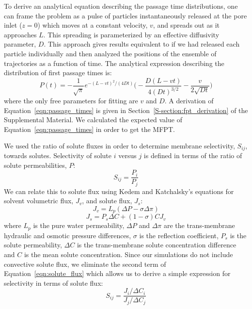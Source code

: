 \documentclass[aps,pre,preprint,groupedaddress,longbibliography]{revtex4-2}
\begin{document}
  To derive an analytical equation describing the passage time distributions, 
  one can frame the 
  problem as a pulse of particles instantaneously released at the pore inlet ($z=0$)
  which moves at a constant velocity, $v$, and spreads out as it approaches $L$. 
  This spreading is parameterized by an effective diffusivity parameter, $D$. This 
  approach gives results equivalent to if we had released each particle individually
  and then analyzed the positions of the ensemble of trajectories as 
  a function of time. The analytical expression describing the distribution of 
  first passage times is:~\cite{cussler_diffusion:_2009}
  \begin{equation}
  P(t) = -\frac{1}{\sqrt{\pi}}e^{-(L - vt)^2 / (4Dt)}\bigg(-\frac{D(L - vt)}{4(Dt)^{3/2}} - \frac{v}{2\sqrt{Dt}}\bigg)
  \label{eqn:passage_times}
  \end{equation} 
  where the only free parameters for fitting are $v$ and $D$. A derivation
  of Equation~\ref{eqn:passage_times} is given in Section~\ref{S-section:fpt_derivation}
  of the Supplemental Material. We calculated the expected value of 
  Equation~\ref{eqn:passage_times} in order to get the MFPT.

  We used the ratio of solute fluxes in order to determine membrane selectivity, $S_{ij}$,
  towards solutes. Selectivity of solute $i$ versus $j$ is defined in terms of the
  ratio of solute permeabilities, $P$:~\cite{guo_pervaporation_2004}
  \begin{equation}
  S_{ij} = \frac{P_i}{P_j}
  \end{equation}
  We can relate this to solute flux using Kedem and Katchalsky's equations for 
  solvent volumetric flux, $J_v$, and solute flux, $J_s$:~\cite{kedem_permeability_1963,al-zoubi_rejection_2007}
  \begin{equation}
  J_v = L_p(\Delta P - \sigma\Delta \pi)
  \end{equation} 
  \begin{equation}
  J_s = P_s \Delta C + (1 - \sigma)CJ_v
  \label{eqn:solute_flux}
  \end{equation}
  where $L_p$ is the pure water permeability, $\Delta P$ and $\Delta \pi$ are the 
  trans-membrane hydraulic and osmotic pressure differences, $\sigma$ is the reflection
  coefficient, $P_s$ is the solute permeability, $\Delta C$ is the trans-membrane
  solute concentration difference and $C$ is the mean solute concentration. Since our
  simulations do not include convective solute flux, we eliminate the second term 
  of Equation~\ref{eqn:solute_flux} which allows us to derive a simple expression
  for selectivity in terms of solute flux:
  \begin{equation}
  S_{ij} = \frac{J_i / \Delta C_i}{J_j / \Delta C_j}
  \label{eqn:selectivity}
  \end{equation}
  
\end{document}
